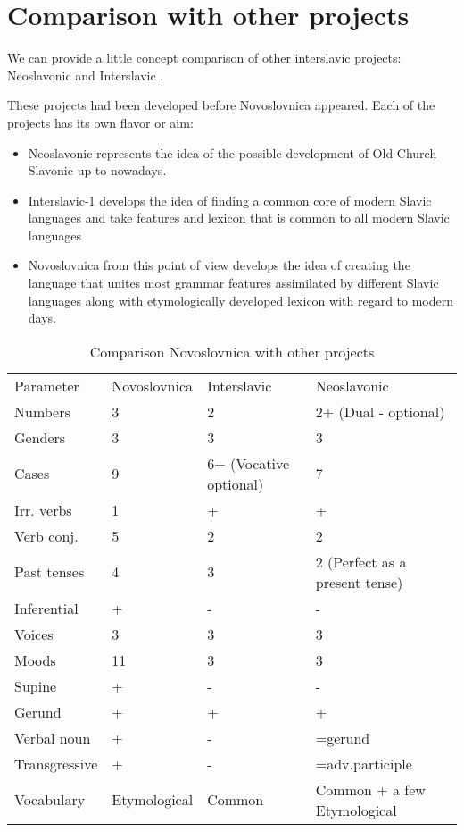 \section{Comparison with other projects}

We can provide a little concept comparison of other interslavic projects: Neoslavonic \cite{neoslavonic} and Interslavic \cite{interslavic}.

These projects had been developed before Novoslovnica appeared. Each of the projects has its own flavor or aim:

\begin{itemize}
	\item Neoslavonic represents the idea of the possible development of Old Church Slavonic up to nowadays.
	\item Interslavic-1 develops the idea of finding a common core of modern Slavic languages and take features and lexicon that is common to all modern Slavic languages
	\item Novoslovnica from this point of view develops the idea of creating the language that unites most grammar features assimilated by different Slavic languages along with etymologically developed lexicon with regard to modern days.
\end{itemize}

\begin{table}[!htb]
	\caption{Comparison Novoslovnica with other projects}
	\begin{tabular}{lp{5em}p{5em}p{5em}}
		Parameter & Novoslovnica & Interslavic & Neoslavonic \\
		Numbers & 3 & 2 & 2+ (Dual - optional) \\
		Genders & 3 & 3 & 3 \\
		Cases & 9 & 6+ (Vocative optional) & 7 \\
		Irr. verbs & 1 & + & + \\
		Verb conj. & 5 & 2 & 2 \\
		Past tenses & 4 & 3 & 2 (Perfect as a present tense)\\
		Inferential & + & - & - \\
		Voices & 3 & 3 & 3 \\
		Moods & 11 & 3 & 3 \\
		Supine & + & - & - \\
		Gerund & + & + & + \\
		Verbal noun & + & - & =gerund \\
		Transgressive & + & - & =adv.participle \\
		Vocabulary & Etymological & Common & Common + a few Etymological 
	\end{tabular}
\end{table}